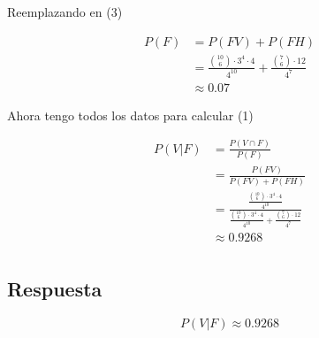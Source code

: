 \documentclass[hidelinks]{article}
\begin{document}
Reemplazando en (3)

\begin{equation*}
    \begin{aligned}
        P(F) &= P(FV) + P(FH)\\
             &= \frac{\binom{10}{6} \cdot 3^{4} \cdot 4}{4^{10}} + \frac{\binom{7}{6} \cdot 12}{4^{7}}\\
             &\approx 0.07
    \end{aligned}
\end{equation*}

Ahora tengo todos los datos para calcular (1)

\begin{equation*}
    \begin{aligned}
        P(V|F) &= \frac{P(V \cap F)}{P(F)}\\
               &= \frac{P(FV)}{P(FV) + P(FH)}\\
               &= \frac{\frac{\binom{10}{6} \cdot 3^{4} \cdot 4}{4^{10}}}{\frac{\binom{10}{6} \cdot 3^{4} \cdot 4}{4^{10}} + \frac{\binom{7}{6} \cdot 12}{4^{7}}}\\
               &\approx 0.9268\\
    \end{aligned}
\end{equation*}

\subsection*{Respuesta}

\begin{equation*}
    \boxed{P(V|F) \approx 0.9268}
\end{equation*}
\end{document}

